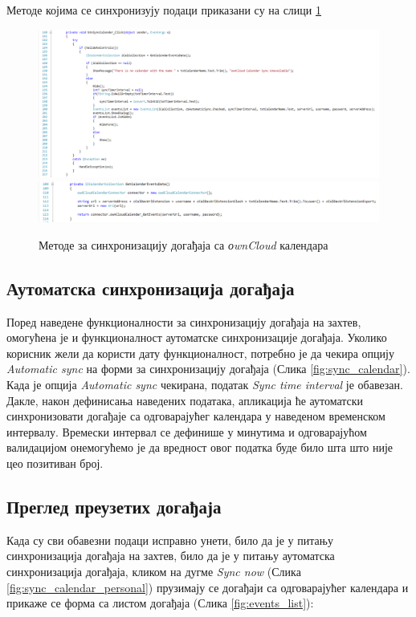 Методе којима се синхронизују подаци приказани су на слици \ref{fig:sync_calendar_method}

\begin{figure}[H]
	\centering
	\includegraphics[scale=0.5]{slike/SyncCalendarMethod.png}
	\includegraphics[scale=0.5]{slike/GetCalendarEventsDataMethod.png}
	\caption{Методе за синхронизацију догађаја са \textit{оwnCloud} календара}
	\label{fig:sync_calendar_method}
\end{figure}

\subsection{Аутоматска синхронизација догађаја}

Поред наведене функционалности за синхронизацију догађаја на захтев, омогућена је и функционалност аутоматске синхронизације догађаја. Уколико корисник жели да користи дату функционалност, потребно је да чекира опцију \textit{Automatic sync} на форми за синхронизацију догађаја (Слика \ref{fig:sync_calendar}). Када је опција \textit{Automatic sync} чекирана, податак \textit{Sync time interval} је обавезан. Дакле, након дефинисања наведених података, апликација ће аутоматски синхронизовати догађаје са одговарајућег календара у наведеном временском интервалу. Времески интервал се дефинише у минутима и одговарајућом валидацијом онемогућемо је да вредност овог податка буде било шта што није цео позитиван број.

\subsection{Преглед преузетих догађаја}
Када су сви обавезни подаци исправно унети, било да је у питању синхронизација догађаја на захтев, било да је у питању аутоматска синхронизација догађаја, кликом на дугме \textit{Sync now} (Слика \ref{fig:sync_calendar_personal}) прузимају се догађаји са одговарајућег календара и прикаже се форма са листом догађаја (Слика \ref{fig:events_list}):

